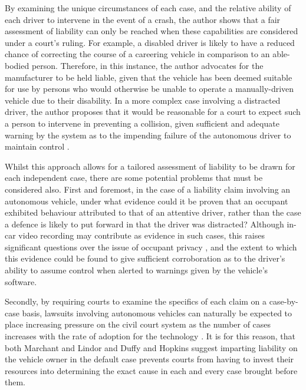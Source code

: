 \documentclass[conference]{IEEEtran}
\begin{document}
 By examining the unique circumstances of each case, and the relative ability of each driver to intervene in the event of a crash, the author shows that a fair assessment of liability can only be reached when these capabilities are considered under a court's ruling. For example, a disabled driver is likely to have a reduced chance of correcting the course of a careering vehicle in comparison to an able-bodied person. Therefore, in this instance, the author advocates for the manufacturer to be held liable, given that the vehicle has been deemed suitable for use by persons who would otherwise be unable to operate a manually-driven vehicle due to their disability. In a more complex case involving a distracted driver, the author proposes that it would be reasonable for a court to expect such a person to intervene in preventing a collision, given sufficient and adequate warning by the system as to the impending failure of the autonomous driver to maintain control \cite{gurney}. 

Whilst this approach allows for a tailored assessment of liability to be drawn for each independent case, there are some potential problems that must be considered also. First and foremost, in the case of a liability claim involving an autonomous vehicle, under what evidence could it be proven that an occupant  exhibited behaviour attributed to that of an attentive driver, rather than the case a defence is likely to put forward in that the driver was distracted? Although in-car video recording may contribute as evidence in such cases, this raises significant questions over the issue of occupant privacy \cite{marshall}, and the extent to which this evidence could be found to give sufficient corroboration as to the driver's ability to assume control when alerted to warnings given by the vehicle's software.

Secondly, by requiring courts to examine the specifics of each claim on a case-by-case basis, lawsuits involving autonomous vehicles can naturally be expected to place increasing pressure on the civil court system as the number of cases increases with the rate of adoption for the technology \cite{marchant}. It is for this reason, that both Marchant and Lindor \cite{marchant} and Duffy and Hopkins \cite{duffy} suggest imparting liability on the vehicle owner in the default case prevents courts from having to invest their resources into determining the exact cause in each and every case brought before them.
\end{document}
